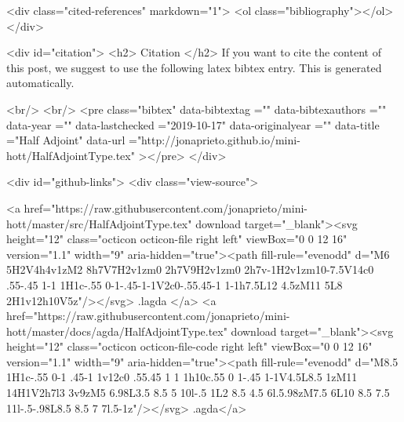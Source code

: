  <div class="cited-references" markdown="1">
  <ol class="bibliography"></ol>
  </div>


  
  <div id="citation">
  <h2> Citation </h2>
  If you want to cite the content of this post,
  we suggest to use the following latex bibtex entry.
  This is generated automatically.

  <br/>
  <br/>
  <pre class="bibtex"
       data-bibtextag =""
       data-bibtexauthors =""
       data-year =""
       data-lastchecked ="2019-10-17"
       data-originalyear =""
       data-title ="Half Adjoint"
       data-url ="http://jonaprieto.github.io/mini-hott/HalfAdjointType.tex"
  ></pre>
  </div>
  

  <div id="github-links">
    <div class="view-source">
      
        <a href="https://raw.githubusercontent.com/jonaprieto/mini-hott/master/src/HalfAdjointType.tex" download target="_blank"><svg height="12" class="octicon octicon-file right left" viewBox="0 0 12 16" version="1.1" width="9" aria-hidden="true"><path fill-rule="evenodd" d="M6 5H2V4h4v1zM2 8h7V7H2v1zm0 2h7V9H2v1zm0 2h7v-1H2v1zm10-7.5V14c0 .55-.45 1-1 1H1c-.55 0-1-.45-1-1V2c0-.55.45-1 1-1h7.5L12 4.5zM11 5L8 2H1v12h10V5z"/></svg> .lagda </a>
        <a href="https://raw.githubusercontent.com/jonaprieto/mini-hott/master/docs/agda/HalfAdjointType.tex" download target="_blank"><svg height="12" class="octicon octicon-file-code right left" viewBox="0 0 12 16" version="1.1" width="9" aria-hidden="true"><path fill-rule="evenodd" d="M8.5 1H1c-.55 0-1 .45-1 1v12c0 .55.45 1 1 1h10c.55 0 1-.45 1-1V4.5L8.5 1zM11 14H1V2h7l3 3v9zM5 6.98L3.5 8.5 5 10l-.5 1L2 8.5 4.5 6l.5.98zM7.5 6L10 8.5 7.5 11l-.5-.98L8.5 8.5 7 7l.5-1z"/></svg> .agda</a>
      
